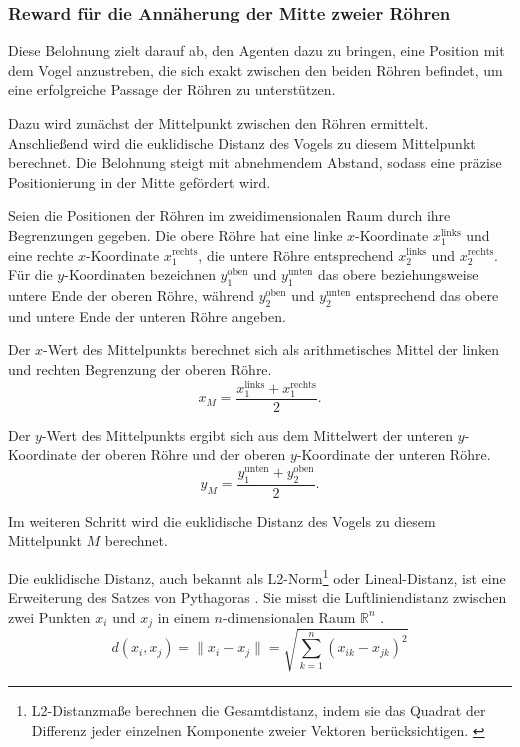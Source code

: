 \documentclass[conference]{IEEEtran}
\begin{document}
\subsubsection{Reward für die Annäherung der Mitte zweier Röhren}\label{reward_shaping_second}
Diese Belohnung zielt darauf ab, den Agenten dazu zu bringen, eine Position mit dem Vogel anzustreben, die sich exakt zwischen den beiden Röhren befindet, um eine erfolgreiche Passage der Röhren zu unterstützen.

Dazu wird zunächst der Mittelpunkt zwischen den Röhren ermittelt. Anschließend wird die euklidische Distanz des Vogels zu diesem Mittelpunkt berechnet. Die Belohnung steigt mit abnehmendem Abstand, sodass eine präzise Positionierung in der Mitte gefördert wird.

Seien die Positionen der Röhren im zweidimensionalen Raum durch ihre Begrenzungen gegeben. Die obere Röhre hat eine linke \(x\)-Koordinate \(x_1^{\text{links}}\) und eine rechte \(x\)-Koordinate \(x_1^{\text{rechts}}\), die untere Röhre entsprechend \(x_2^{\text{links}}\) und \(x_2^{\text{rechts}}\). Für die \(y\)-Koordinaten bezeichnen \(y_1^{\text{oben}}\) und \(y_1^{\text{unten}}\) das obere beziehungsweise untere Ende der oberen Röhre, während \(y_2^{\text{oben}}\) und \(y_2^{\text{unten}}\) entsprechend das obere und untere Ende der unteren Röhre angeben.

Der \(x\)-Wert des Mittelpunkts berechnet sich als arithmetisches Mittel der linken und rechten Begrenzung der oberen Röhre.
\begin{equation}
	x_M = \frac{x_1^{\text{links}} + x_1^{\text{rechts}}}{2}.
\end{equation}

Der \(y\)-Wert des Mittelpunkts ergibt sich aus dem Mittelwert der unteren \(y\)-Koordinate der oberen Röhre und der oberen \(y\)-Koordinate der unteren Röhre.
\begin{equation}
	y_M = \frac{y_1^{\text{unten}} + y_2^{\text{oben}}}{2}.
\end{equation}

Im weiteren Schritt wird die euklidische Distanz des Vogels zu diesem Mittelpunkt \(M\) berechnet. 

Die euklidische Distanz, auch bekannt als L2-Norm\footnote{L2-Distanzmaße berechnen die Gesamtdistanz, indem sie das Quadrat der Differenz jeder einzelnen Komponente zweier Vektoren berücksichtigen. \cite[S. 15]{prasath_distance_2019}} oder Lineal-Distanz, ist eine Erweiterung des Satzes von Pythagoras \cite[S. 10]{prasath_distance_2019}. Sie misst die Luftliniendistanz zwischen zwei Punkten \( x_i \) und \( x_j \) in einem \( n \)-dimensionalen Raum $\mathbb{R}^n$ \cite[S. 719]{madhulatha_overview_2012} \cite[S. 2]{mussabayev_optimizing_2024}.
\begin{equation}
	d(x_i, x_j) = \|x_i - x_j\| = \sqrt{ \sum_{k=1}^{n} (x_{ik} - x_{jk})^2 }
	\label{eq:euklidische_distanz}
\end{equation}
\end{document}

